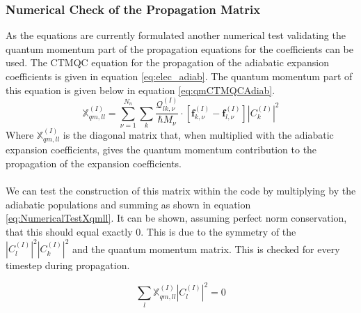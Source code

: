 \subsubsection{Numerical Check of the Propagation Matrix}
\label{sect:sumXqmll}
As the equations are currently formulated another numerical test validating the quantum momentum part of the propagation equations for the coefficients can be used. The CTMQC equation for the propagation of the adiabatic expansion coefficients is given in equation \eqref{eq:elec_adiab}. The quantum momentum part of this equation is given below in equation \eqref{eq:qmCTMQCAdiab}. 
\begin{equation}
  \mathbb{X}_{qm, ll}^{(I)} = \sum_{\nu=1}^{N_n}\sum_{k} \frac{\mathcal{Q}_{lk, \nu}^{(I)}}{\hbar     M_\nu} \cdot \left[ \mathbf{f}_{k,\nu}^{(I)} - \mathbf{f}_{l,\nu}^{(I)}   \right] |C_{k}^{(I)}|^2
  \label{eq:qmCTMQCAdiab}
\end{equation}
Where $\mathbb{X}_{qm, ll}^{(I)}$ is the diagonal matrix that, when multiplied with the adiabatic expansion coefficients, gives the quantum momentum contribution to the propagation of the expansion coefficients.
\\\\
We can test the construction of this matrix within the code by multiplying by the adiabatic populations and summing as shown in equation \eqref{eq:NumericalTestXqmll}. It can be shown, assuming perfect norm conservation, that this should equal exactly 0. This is due to the symmetry of the $|C_{l}^{(I)}|^2|C_{k}^{(I)}|^2$ and the quantum momentum matrix. This is checked for every timestep during propagation.

\begin{equation}
  \sum_{l} \mathbb{X}_{qm, ll}^{(I)} |C_{l}^{(I)}|^2 = 0
  \label{eq:NumericalTestXqmll}
\end{equation}


